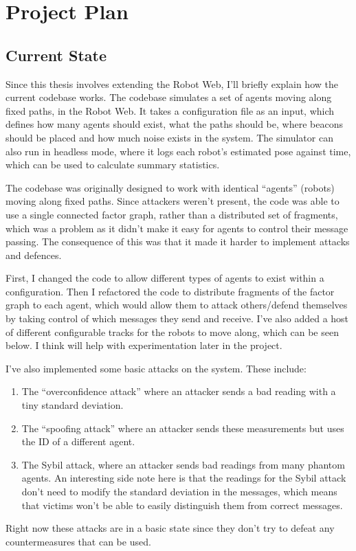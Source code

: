 \chapter{Project Plan}

\section{Current State}
Since this thesis involves extending the Robot Web, I'll briefly explain how the current codebase works. The codebase simulates a set of agents moving along fixed paths, in the Robot Web. It takes a configuration file as an input, which defines how many agents should exist, what the paths should be, where beacons should be placed and how much noise exists in the system. The simulator can also run in headless mode, where it logs each robot's estimated pose against time, which can be used to calculate summary statistics.

The codebase was originally designed to work with identical ``agents'' (robots) moving along fixed paths. Since attackers weren't present, the code was able to use a single connected factor graph, rather than a distributed set of fragments, which was a problem as it didn't make it easy for agents to control their message passing. The consequence of this was that it made it harder to implement attacks and defences. 

First, I changed the code to allow different types of agents to exist within a configuration. Then I refactored the code to distribute fragments of the factor graph to each agent, which would allow them to attack others/defend themselves by taking control of which messages they send and receive. I've also added a host of different configurable tracks for the robots to move along, which can be seen below. I think will help with experimentation later in the project.

I've also implemented some basic attacks on the system. These include:
\begin{enumerate}
    \item  The ``overconfidence attack'' where an attacker sends a bad reading with a tiny standard deviation.
    \item The ``spoofing attack'' where an attacker sends these measurements but uses the ID of a different agent.
    \item The Sybil attack, where an attacker sends bad readings from many phantom agents. An interesting side note here is that the readings for the Sybil attack don't need to modify the standard deviation in the messages, which means that victims won't be able to easily distinguish them from correct messages.
\end{enumerate}
Right now these attacks are in a basic state since they don't try to defeat any countermeasures that can be used.

